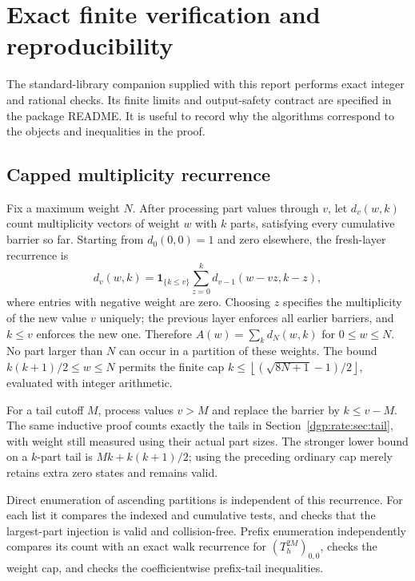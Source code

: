 \documentclass[11pt,letterpaper]{article}
\numberwithin{equation}{section}
\theoremstyle{remark}\newtheorem{remark}[theorem]{Remark}
\newcommand{\floor}[1]{\left\lfloor #1\right\rfloor}
\begin{document}
\section{Exact finite verification and reproducibility}\label{dgp:rate:sec:checks}
The standard-library companion supplied with this report performs exact
integer and rational checks. Its finite limits and output-safety contract
are specified in the package README. It is useful to record why the
algorithms correspond to the objects and inequalities in the proof.

\subsection{Capped multiplicity recurrence}
Fix a maximum weight $N$. After processing part values through $v$, let
$d_v(w,k)$ count multiplicity vectors of weight $w$ with $k$ parts,
satisfying every cumulative barrier so far. Starting from
$d_0(0,0)=1$ and zero elsewhere, the fresh-layer recurrence is
\begin{equation}\label{dgp:rate:eq:dp}
 d_v(w,k)=\mathbf1_{\{k\leq v\}}
 \sum_{z=0}^k d_{v-1}(w-vz,k-z),
\end{equation}
where entries with negative weight are zero. Choosing $z$ specifies the
multiplicity of the new value $v$ uniquely; the previous layer enforces
all earlier barriers, and $k\leq v$ enforces the new one. Therefore
$A(w)=\sum_kd_N(w,k)$ for $0\leq w\leq N$. No part larger than $N$ can
occur in a partition of these weights. The bound
$k(k+1)/2\leq w\leq N$ permits the finite cap
$k\leq\floor{(\sqrt{8N+1}-1)/2}$, evaluated with integer arithmetic.

For a tail cutoff $M$, process values $v>M$ and replace the barrier by
$k\leq v-M$. The same inductive proof counts exactly the tails in
Section~\ref{dgp:rate:sec:tail}, with weight still measured using their actual
part sizes. The stronger lower bound on a $k$-part tail is
$Mk+k(k+1)/2$; using the preceding ordinary cap merely retains extra zero
states and remains valid.

Direct enumeration of ascending partitions is independent of this
recurrence. For each list it compares the indexed and cumulative tests,
and checks that the largest-part injection is valid and collision-free.
Prefix enumeration independently compares its count with an exact
walk recurrence for $(T_h^{2M})_{0,0}$, checks the weight cap, and checks
the coefficientwise prefix-tail inequalities.
\end{document}
